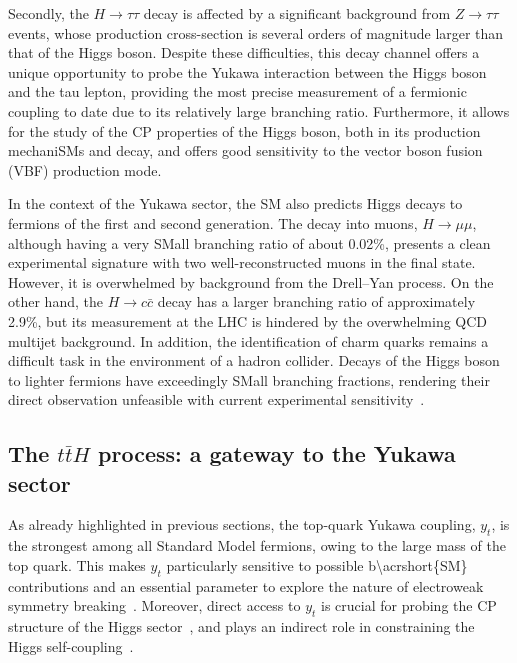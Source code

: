 \documentclass[11pt,twoside]{book}
\begin{document}
Secondly, the $H \rightarrow \tau\tau$ decay is affected by a significant background from $Z \rightarrow \tau\tau$ events, whose production cross-section is several orders of magnitude larger than that of the Higgs boson. Despite these difficulties, this decay channel offers a unique opportunity to probe the Yukawa interaction between the Higgs boson and the tau lepton, providing the most precise measurement of a fermionic coupling to date due to its relatively large branching ratio. Furthermore, it allows for the study of the CP properties of the Higgs boson, both in its production mechani\acrshort{SM}s and decay, and offers good sensitivity to the vector boson fusion (VBF) production mode.

In the context of the Yukawa sector, the \acrshort{SM} also predicts Higgs decays to fermions of the first and second generation. The decay into muons, $H \rightarrow \mu\mu$, although having a very \acrshort{SM}all branching ratio of about 0.02\%, presents a clean experimental signature with two well-reconstructed muons in the final state. However, it is overwhelmed by background from the Drell--Yan process. On the other hand, the $H \rightarrow c\bar{c}$ decay has a larger branching ratio of approximately 2.9\%, but its measurement at the LHC is hindered by the overwhelming \acrshort{QCD} multijet background. In addition, the identification of charm quarks remains a difficult task in the environment of a hadron collider. Decays of the Higgs boson to lighter fermions have exceedingly \acrshort{SM}all branching fractions, rendering their direct observation unfeasible with current experimental sensitivity~\cite{https://arxiv.org/abs/1610.07922}.

\subsection{The $t\bar{t}H$ process: a gateway to the Yukawa sector}
\label{sec:ttH}
As already highlighted in previous sections, the top-quark Yukawa coupling, $y_t$, is the strongest among all Standard Model fermions, owing to the large mass of the top quark. This makes $y_t$ particularly sensitive to possible \acrshort{b\acrshort{SM}} contributions and an essential parameter to explore the nature of electroweak symmetry breaking~\cite{Englert:2014uua,Dobrescu:1997nm,Chivukula:1998wd,Delepine:1995qs}. Moreover, direct access to $y_t$ is crucial for probing the CP structure of the Higgs sector~\cite{Bernreuther:2002uj,Brod:2013cka}, and plays an indirect role in constraining the Higgs self-coupling~\cite{Buttazzo:2013uya,Degrassi:2016wml}.
\end{document}
